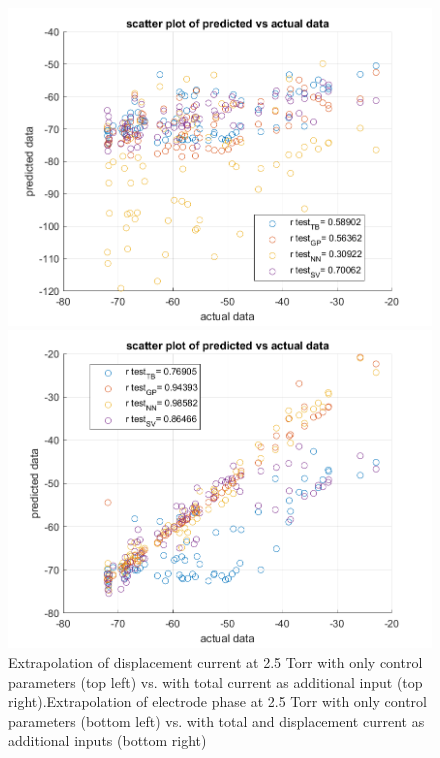 \documentclass[12pt]{iopart}
\begin{document}
\begin{figure}[ht!]
\begin{center}
\begin{minipage}{0.495\textwidth}
    \includegraphics[width=1\textwidth]{phaseWcontrol.png}
\end{minipage}
\begin{minipage}{0.495\textwidth}
    \includegraphics[width=1\textwidth]{phase.png}
\end{minipage}


\caption{Extrapolation of displacement current at 2.5 Torr with only control parameters (top left) vs. with total current as additional input (top right).Extrapolation of electrode phase at 2.5 Torr with only control parameters (bottom left) vs. with total and displacement current as additional inputs (bottom right)} 

\label{Fig:gap_SV,pressure_TB,species_TB}
\end{center}
\end{figure}
\end{document}
